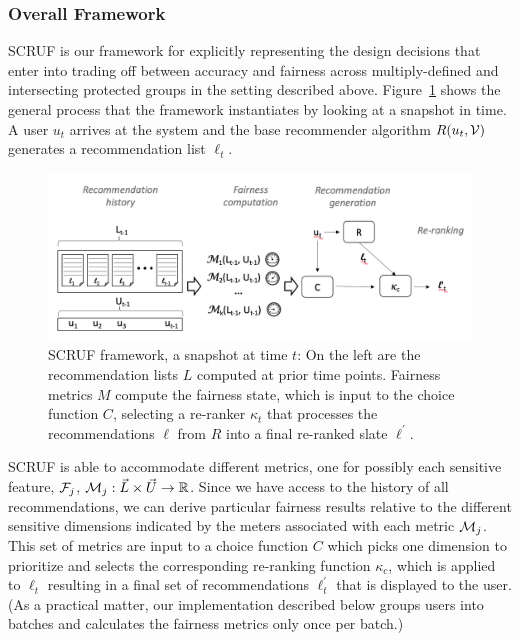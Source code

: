 \subsubsection{\textbf{Overall Framework}}
\hfill

SCRUF is our framework for explicitly representing the design decisions that enter into trading off between accuracy and fairness across multiply-defined and intersecting protected groups in the setting described above. Figure~\ref{fig:framework} shows the general process that the framework instantiates by looking at a snapshot in time. A user $u_t$ arrives at the system and the base recommender algorithm $R(u_t,\mathcal{V})$ generates a recommendation list $\ell_t$. 

\begin{figure}[tb]
    \centering
    \includegraphics[width=5.5in]{imgs/dynfair/process-graphic.png}
    \caption{SCRUF framework, a snapshot at time $t$: On the left are the recommendation lists $L$ computed at prior time points. Fairness metrics $M$ compute the fairness state, which is input to the choice function $C$, selecting a re-ranker $\kappa_t$ that processes the recommendations $\ell$ from $R$ into a final re-ranked slate $\ell^{\prime}$.}
    \label{fig:framework}
\end{figure}

SCRUF is able to accommodate different metrics, one for possibly each sensitive feature, $\mathcal{F}_j$, $\mathcal{M}_j: \vec{L} \times \vec{U} \rightarrow \mathbb{R}$.  Since we have access to the history of all recommendations, we can derive particular fairness results relative to the different sensitive dimensions indicated by the meters associated with each metric $\mathcal{M}_j$. This set of metrics are input to a choice function $C$ which picks one dimension to prioritize and selects the corresponding re-ranking function $\kappa_c$, which is applied to $\ell_t$ resulting in a final set of recommendations $\ell^{\prime}_t$ that is displayed to the user. (As a practical matter, our implementation described below groups users into batches and calculates the fairness metrics only once per batch.)

